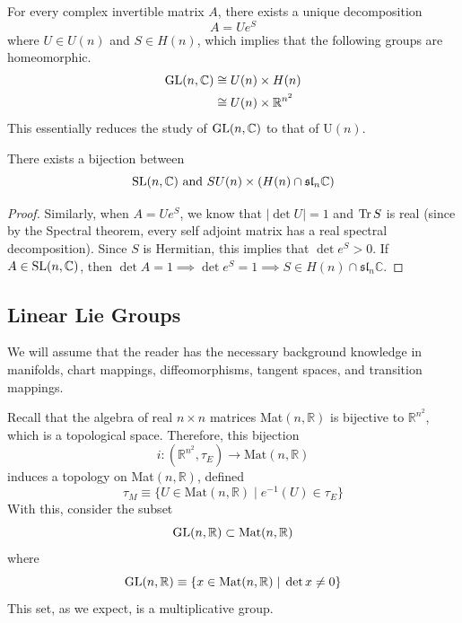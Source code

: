   \begin{corollary}
    For every complex invertible matrix $A$, there exists a unique decomposition
    \begin{equation}
      A = U e^S
    \end{equation}
    where $U \in U(n)$ and $S \in H(n)$, which implies that the following groups are homeomorphic. 
    \begin{align*}
      \operatorname{GL}(n, \mathbb{C}) & \cong U(n) \times H(n) \\
      & \cong U(n) \times \mathbb{R}^{n^2}
    \end{align*} 
    This essentially reduces the study of $\operatorname{GL}(n, \mathbb{C})$ to that of U$(n)$. 
  \end{corollary}

  \begin{corollary}
    There exists a bijection between 
    \begin{equation}
      \operatorname{SL}(n, \mathbb{C}) \text{ and } SU(n) \times (H(n) \cap \mathfrak{sl}_n \mathbb{C})
    \end{equation}
  \end{corollary}
  \begin{proof}
    Similarly, when $A = U e^S$, we know that $|\det{U}| = 1$ and $\operatorname{Tr}{S}$ is real (since by the Spectral theorem, every self adjoint matrix has a real spectral decomposition). Since $S$ is Hermitian, this implies that $\det{e^S} > 0$. If $A \in \operatorname{SL}(n, \mathbb{C})$, then $\det{A} = 1 \implies \det{e^S} = 1 \implies S \in H(n) \cap \mathfrak{sl}_n \mathbb{C}$. 
  \end{proof}

\subsection{Linear Lie Groups}

  We will assume that the reader has the necessary background knowledge in manifolds, chart mappings, diffeomorphisms, tangent spaces, and transition mappings. 

  Recall that the algebra of real $n \times n$ matrices Mat$(n, \mathbb{R})$ is bijective to $\mathbb{R}^{n^2}$, which is a topological space. Therefore, this bijection 
  \begin{equation}
    i:(\mathbb{R}^{n^2}, \tau_E) \rightarrow \text{Mat}(n, \mathbb{R})
  \end{equation}
  induces a topology on Mat$(n, \mathbb{R})$, defined 
  \begin{equation}
    \tau_M \equiv \{U \in \text{Mat}(n, \mathbb{R}) \; | \; e^{-1} (U) \in \tau_E\}
  \end{equation}
  With this, consider the subset
  \begin{equation}
    \operatorname{GL}(n, \mathbb{R}) \subset \text{Mat}(n, \mathbb{R})
  \end{equation}
  where
  \begin{equation}
    \operatorname{GL}(n, \mathbb{R}) \equiv \{x \in \text{Mat}(n, \mathbb{R}) \;|\; \det{x} \neq 0\}
  \end{equation}
  This set, as we expect, is a multiplicative group. 

